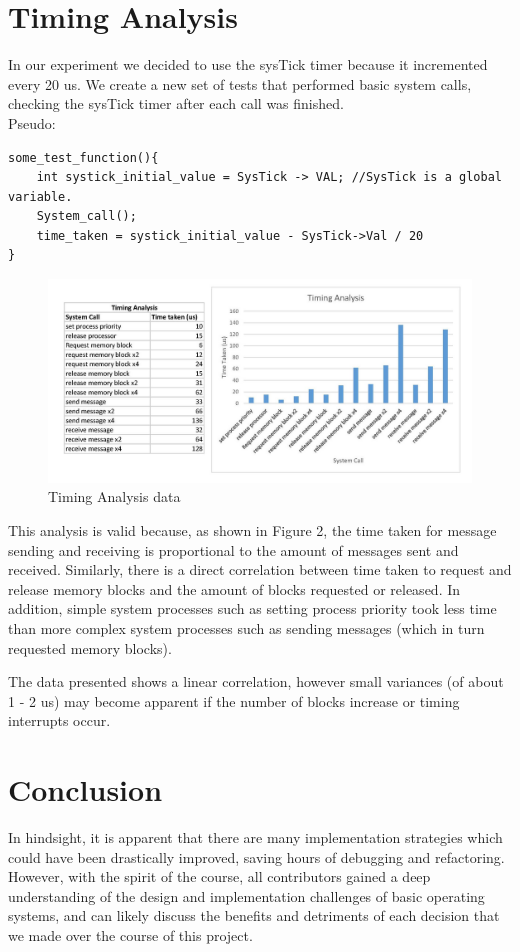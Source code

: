\documentclass[11pt, oneside]{article}
\begin{document}
\section{Timing Analysis}
In our experiment we decided to use the sysTick timer because it incremented every 20 us. We create a new set of tests that performed basic system calls, checking the sysTick timer after each call was finished.  \\
\newline
Pseudo:
\begin{verbatim}
some_test_function(){
	int systick_initial_value = SysTick -> VAL; //SysTick is a global variable.
	System_call();
	time_taken = systick_initial_value - SysTick->Val / 20
}
\end{verbatim}

\begin{figure}[ht!]
\centering
\includegraphics[width=170mm]{TimingAnalysisGraph.jpg}
\caption{Timing Analysis data \label{overflow}}
\end{figure}

This analysis is valid because, as shown in Figure 2, the time taken for message sending and receiving is proportional to the amount of messages sent and received. Similarly, there is a direct correlation between time taken to request and release memory blocks and the amount of blocks requested or released. In addition, simple system processes such as setting process priority took less time than more complex system processes such as sending messages (which in turn requested memory blocks).

The data presented shows a linear correlation, however small variances (of about 1 - 2 us) may become apparent if the number of blocks increase or timing interrupts occur.

\section{Conclusion}
In hindsight, it is apparent that there are many implementation strategies which could have been drastically improved, saving hours of debugging and refactoring. However, with the spirit of the course, all contributors gained a deep understanding of the design and implementation challenges of basic operating systems, and can likely discuss the benefits and detriments of each decision that we made over the course of this project.
\end{document}
